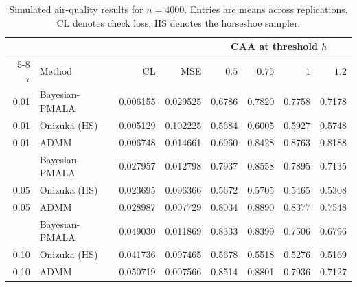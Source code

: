 \begin{table}[H]
\centering
\small
\setlength{\tabcolsep}{4pt}
\caption{Simulated air-quality results for $n=4000$. Entries are means across replications. CL denotes check loss; HS denotes the horseshoe sampler.}
\label{tab:air_n4000}
\begin{tabular}{@{}rlrrrrrr@{}}
\toprule
 & & & & \multicolumn{4}{c}{CAA at threshold $h$} \\
\cmidrule(lr){5-8}
$\tau$ & Method & CL & MSE & $0.5$ & $0.75$ & $1$ & $1.2$ \\
\midrule
0.01 & Bayesian-PMALA & 0.006155 & 0.029525 & 0.6786 & 0.7820 & 0.7758 & 0.7178 \\
0.01 & Onizuka (HS) & 0.005129 & 0.102225 & 0.5684 & 0.6005 & 0.5927 & 0.5748 \\
0.01 & ADMM & 0.006748 & 0.014661 & 0.6960 & 0.8428 & 0.8763 & 0.8188 \\
\addlinespace[3pt]
0.05 & Bayesian-PMALA & 0.027957 & 0.012798 & 0.7937 & 0.8558 & 0.7895 & 0.7135 \\
0.05 & Onizuka (HS) & 0.023695 & 0.096366 & 0.5672 & 0.5705 & 0.5465 & 0.5308 \\
0.05 & ADMM & 0.028987 & 0.007729 & 0.8034 & 0.8890 & 0.8377 & 0.7548 \\
\addlinespace[3pt]
0.10 & Bayesian-PMALA & 0.049030 & 0.011869 & 0.8333 & 0.8399 & 0.7506 & 0.6796 \\
0.10 & Onizuka (HS) & 0.041736 & 0.097465 & 0.5678 & 0.5518 & 0.5276 & 0.5169 \\
0.10 & ADMM & 0.050719 & 0.007566 & 0.8514 & 0.8801 & 0.7936 & 0.7127 \\
\bottomrule
\end{tabular}
\end{table}

